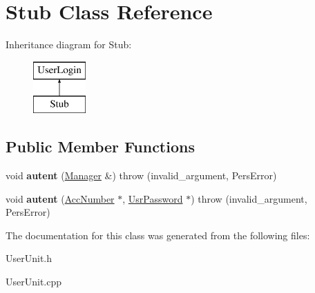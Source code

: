 \hypertarget{classStub}{\section{Stub Class Reference}
\label{df/d32/classStub}
}
Inheritance diagram for Stub\-:\begin{figure}[H]
\begin{center}
\leavevmode
\includegraphics[height=2.000000cm]{df/d32/classStub}
\end{center}
\end{figure}
\subsection*{Public Member Functions}
\begin{DoxyCompactItemize}
\item 
\hypertarget{classStub_a55dbf9448d1ef2562db21d9bc2a088e3}{void {\bfseries autent} (\hyperlink{classManager}{Manager} \&)  throw (invalid\-\_\-argument, Pers\-Error)}\label{df/d32/classStub_a55dbf9448d1ef2562db21d9bc2a088e3}

\item 
\hypertarget{classStub_a54f4b3e333f8c44c05b9098108d7970e}{void {\bfseries autent} (\hyperlink{classAccNumber}{Acc\-Number} $\ast$, \hyperlink{classUsrPassword}{Usr\-Password} $\ast$)  throw (invalid\-\_\-argument, Pers\-Error)}\label{df/d32/classStub_a54f4b3e333f8c44c05b9098108d7970e}

\end{DoxyCompactItemize}


The documentation for this class was generated from the following files\-:\begin{DoxyCompactItemize}
\item 
User\-Unit.\-h\item 
User\-Unit.\-cpp\end{DoxyCompactItemize}
